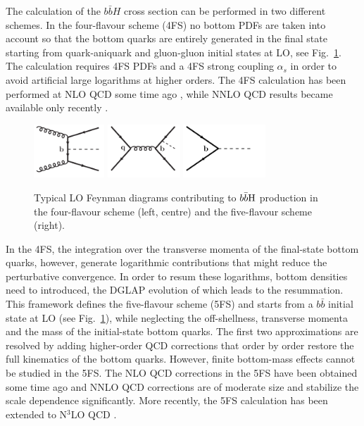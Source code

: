 \documentclass[11pt,a4paper]{article}
\begin{document}
The calculation of the $b\bar bH$ cross section can be performed in two different schemes. In the four-flavour scheme (4FS) no bottom PDFs are taken into account so that the bottom quarks are entirely generated in the final state starting from quark-aniquark and gluon-gluon initial states at LO, see Fig.~\ref{fig:bbhlo}. The calculation requires 4FS PDFs and a 4FS strong coupling $\alpha_s$ in order to avoid artificial large logarithms at higher orders. The 4FS calculation has been performed at NLO QCD some time ago \cite{dittmaier:2003ej,dawson:2003kb}, while NNLO QCD results became available only recently \cite{Biello:2024pgo}.
\begin{figure}[hbt]
\begin{center}
    \includegraphics[height=2cm]{./diags/gg-bbH.pdf}\hspace*{2cm}
    \includegraphics[height=2cm]{./diags/qq-bbH.pdf}\hspace*{2cm}
    \includegraphics[height=2cm]{./diags/bb-H.pdf}
	\vspace{0.2cm}
  \caption{Typical LO Feynman diagrams contributing to $b\bar{b}\text{H}$ production in
the four-flavour scheme (left, centre) and the five-flavour scheme (right).}
  \label{fig:bbhlo}
\end{center}
\end{figure}

In the 4FS, the integration over the transverse momenta of the final-state bottom quarks, however, generate logarithmic contributions that might reduce the perturbative convergence. In order to resum these logarithms, bottom densities need to introduced, the DGLAP evolution of which leads to the resummation. This framework defines the five-flavour scheme (5FS) and starts from a $b\bar b$ initial state at LO (see Fig.~\ref{fig:bbhlo}), while neglecting the off-shellness, transverse momenta and the mass of the initial-state bottom quarks. The first two approximations are resolved by adding higher-order QCD corrections that order by order restore the full kinematics of the bottom quarks. However, finite bottom-mass effects cannot be studied in the 5FS. The NLO QCD corrections in the 5FS have been obtained some time ago \cite{dicus:1998hs,balazs:1998bm} and NNLO QCD corrections are of moderate size \cite{harlander_2003} and stabilize the scale dependence significantly. More recently, the 5FS calculation has been extended to N$^3$LO QCD \cite{duhr:2019kwi}.
\end{document}
